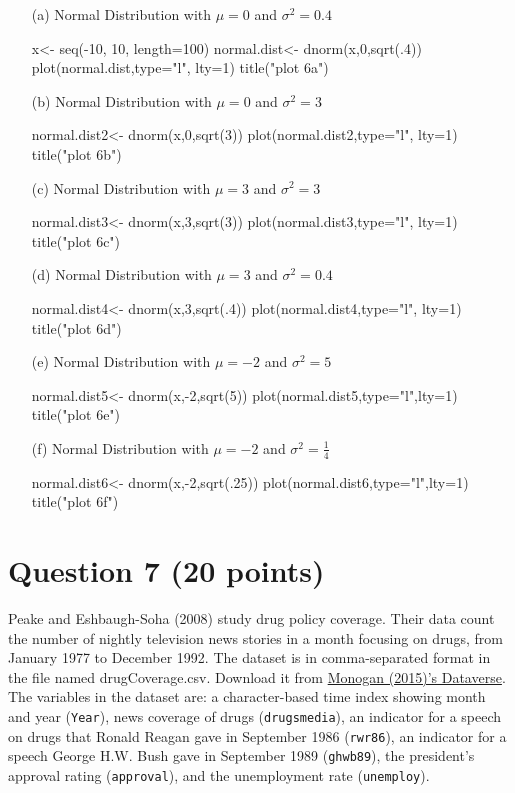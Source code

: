 \documentclass[12pt,letterpaper]{article}
\begin{document}
\begin{itemize}
\item[(a)]  Normal Distribution with $\mu=0$ and $\sigma^2=0.4$

x<- seq(-10, 10, length=100)
normal.dist<- dnorm(x,0,sqrt(.4))
plot(normal.dist,type="l", lty=1)
title("plot 6a")
\item[(b)]  Normal Distribution with $\mu=0$ and $\sigma^2=3$

normal.dist2<- dnorm(x,0,sqrt(3))
plot(normal.dist2,type="l", lty=1)
title("plot 6b")
\item[(c)]  Normal Distribution with $\mu=3$ and $\sigma^2=3$

normal.dist3<- dnorm(x,3,sqrt(3))
plot(normal.dist3,type="l", lty=1)
title("plot 6c")
\item[(d)]  Normal Distribution with $\mu=3$ and $\sigma^2=0.4$

normal.dist4<- dnorm(x,3,sqrt(.4))
plot(normal.dist4,type="l", lty=1)
title("plot 6d")
\item[(e)]  Normal Distribution with $\mu=-2$ and $\sigma^2=5$

normal.dist5<- dnorm(x,-2,sqrt(5))
plot(normal.dist5,type="l",lty=1)
title("plot 6e")
\item[(f)] Normal Distribution with $\mu=-2$ and $\sigma^2=\frac{1}{4}$

normal.dist6<- dnorm(x,-2,sqrt(.25))
plot(normal.dist6,type="l",lty=1)
title("plot 6f")

\end{itemize}

\section*{Question 7 (20 points)}
Peake and Eshbaugh-Soha (2008) study drug policy coverage. Their data count the number of nightly television news stories in a month focusing on drugs, from January 1977 to December 1992. The dataset is in comma-separated format in the file named drugCoverage.csv. Download it from \href{https://dataverse.harvard.edu/dataset.xhtml?persistentId=doi:10.7910/DVN/ARKOTI}{Monogan (2015)'s Dataverse}. The variables in the dataset are: a character-based time index showing month and year (\texttt{Year}), news coverage of drugs (\texttt{drugsmedia}), an indicator for a speech on drugs that Ronald Reagan gave in September 1986 (\texttt{rwr86}), an indicator for a speech George H.W. Bush gave in September 1989 (\texttt{ghwb89}), the president's approval rating (\texttt{approval}), and the unemployment rate (\texttt{unemploy}).
\end{document}
